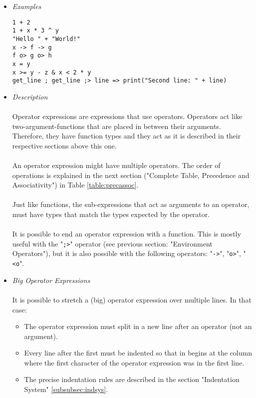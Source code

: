 \documentclass{article}
\begin{document}
\begin{itemize}
\item \textit{Examples}
\begin{verbatim}
1 + 2
1 + x * 3 ^ y
"Hello " + "World!"
x -> f -> g
f o> g o> h
x = y
x >= y - z & x < 2 * y
get_line ; get_line ;> line => print("Second line: " + line)
\end{verbatim}

\item \textit{Description}\\\\
Operator expressions are expressions that use operators. Operators act like
two-argument-functions that are placed in between their arguments. Therefore,
they have function types and they act as it is described in their respective
sections above this one.
\\\\
An operator expression might have multiple operators. The order of operations
is explained in the next section ("Complete Table, Precedence and Associativity")
in Table \ref{table:precassoc}.
\\\\
Just like functions, the sub-expressions
that act as arguments to an operator, must have types that match the types 
expected by the operator.
\\\\
It is possible to end an operator expression with a function. This is mostly
useful with the "\texttt{;>}" operator (see previous section: "Environment
Operators"), but it is also possible with the following operators:
"\texttt{->}", "\texttt{o>}", "\texttt{<o}".

\item \textit{Big Operator Expressions}\\\\
It is possible to stretch a (big) operator expression over multiple lines.
In that case:
\begin{itemize}
\item
The operator expression must split in a new line after an operator (not an
argument).

\item
Every line after the first must be indented so that in begins at the column 
where the first character of the operator expression was in the first line.

\item
The precise indentation rules are described in the section
"Indentation System" \ref{subsubsec:indsys}.
\end{itemize}


\end{itemize}
\end{document}
